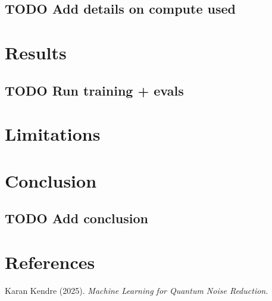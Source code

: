 \documentclass[11pt]{article}
\begin{document}
\subsection{{\bfseries\sffamily TODO} Add details on compute used}
\label{sec:org46d9fdc}
\section{Results}
\label{sec:org6c9a0d0}
\subsection{{\bfseries\sffamily TODO} Run training + evals}
\label{sec:org75cf667}
\section{Limitations}
\label{sec:orgf87573f}
\section{Conclusion}
\label{sec:orgaa3aed5}
\subsection{{\bfseries\sffamily TODO} Add conclusion}
\label{sec:org9a3c390}
\section{References}
\label{sec:org22bb77f}
\noindent
Karan Kendre (2025). \emph{Machine Learning for Quantum Noise Reduction}.
\end{document}
